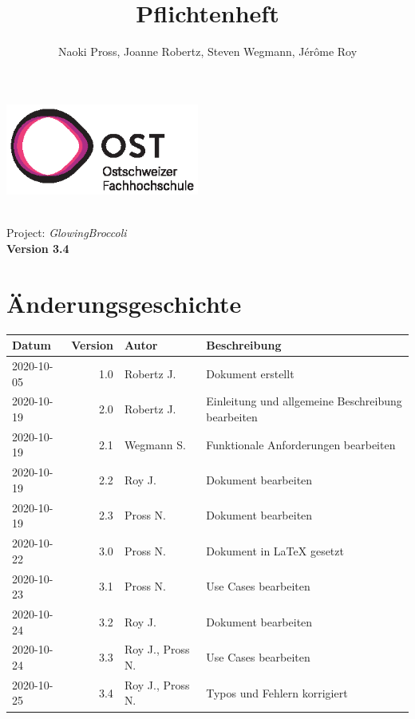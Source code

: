 \documentclass[a4paper, twosided, 11pt]{scrartcl}
\title{Pflichtenheft}
\author{Naoki Pross, Joanne Robertz, Steven Wegmann, J\'er\^ome Roy}
\begin{document}
\begin{titlepage}
  \includegraphics[height=3cm]{pic/ost-logo}
  \begin{flushright}
    \vspace{5cm}
    {\Huge \bfseries \thetitle} \\
    \vspace{5mm}
    {\LARGE Project: \textit{GlowingBroccoli}} \\
    \vspace{5mm}
    {\LARGE \bfseries Version 3.4}
  \end{flushright}
\end{titlepage}


\clearpage
\section*{\"Anderungsgeschichte}
\begin{tabularx}{\textwidth}{lrlX}
  \toprule
  \bfseries Datum & \bfseries Version & \bfseries Autor & \bfseries Beschreibung \\
  \midrule
  2020-10-05 & 1.0 & Robertz J.       & Dokument erstellt \\
  2020-10-19 & 2.0 & Robertz J.       & Einleitung und allgemeine Beschreibung bearbeiten \\
  2020-10-19 & 2.1 & Wegmann S.       & Funktionale Anforderungen bearbeiten \\
  2020-10-19 & 2.2 & Roy J.           & Dokument bearbeiten \\
  2020-10-19 & 2.3 & Pross N.         & Dokument bearbeiten \\
  2020-10-22 & 3.0 & Pross N.         & Dokument in \textrm{\LaTeX} gesetzt \\
  2020-10-23 & 3.1 & Pross N.         & Use Cases bearbeiten \\
  2020-10-24 & 3.2 & Roy J.           & Dokument bearbeiten \\
  2020-10-24 & 3.3 & Roy J., Pross N. & Use Cases bearbeiten \\
  2020-10-25 & 3.4 & Roy J., Pross N. & Typos und Fehlern korrigiert \\
  \bottomrule
\end{tabularx}
\end{document}
